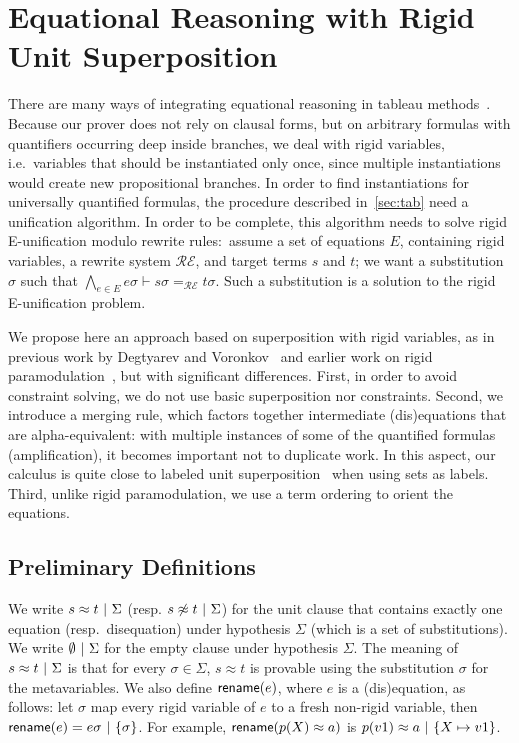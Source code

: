 
\section{Equational Reasoning with Rigid Unit Superposition}
\label{sec:super}

There are many ways of integrating equational reasoning in tableau
methods~\cite{DB75,LS02,BR15,DV96}. Because our prover does not rely on clausal
forms, but on arbitrary formulas with quantifiers occurring deep inside
branches, we deal with rigid variables, i.e.~variables that should be instantiated
only once, since multiple instantiations would create new propositional branches.
In order to find instantiations for universally quantified formulas, the procedure
described in~\ref{sec:tab} need a unification algorithm. In order to be complete,
this algorithm needs to solve rigid E-unification modulo rewrite rules:~assume a set of
equations $E$, containing rigid variables, a rewrite system $\mathcal{RE}$,
and target terms $s$ and $t$; we want a substitution $\sigma$ such that
$\bigwedge_{e \in E} e\sigma \vdash s\sigma =_\mathcal{RE} t\sigma$. Such a
substitution is a solution to the rigid E-unification problem.

We propose here an approach based on superposition with rigid variables, as in
previous work by Degtyarev and Voronkov~\cite{DV96} and earlier work on rigid
paramodulation~\cite{DAP00}, but with significant differences. First, in order
to avoid constraint solving, we do not use basic superposition nor
constraints. Second, we introduce a merging rule, which factors together
intermediate (dis)equations that are alpha-equivalent: with multiple instances
of some of the quantified formulas (amplification), it becomes important not to
duplicate work. In this aspect, our calculus is quite close to labeled unit
superposition~\cite{KS10} when using sets as labels. Third, unlike rigid
paramodulation, we use a term ordering to orient the equations.

\subsection{Preliminary Definitions}

We write $  s \approx t  ~|~  \Sigma$ (resp.
$ s \not\approx t  ~|~  \Sigma$) for the unit clause that contains
exactly one equation (resp.~disequation) under hypothesis $\Sigma$ (which is a
set of substitutions). We write $\emptyset ~|~ \Sigma$ for the
empty clause under hypothesis $\Sigma$.
The meaning of $s \approx t ~|~  \Sigma$ is
that for every $\sigma \in \Sigma$, $s \approx t$ is provable using the
substitution $\sigma$ for the metavariables.
We also define $\textsf{rename}(e)$, where $e$
is a (dis)equation, as follows: let $\sigma$ map every rigid variable of $e$ to
a fresh non-rigid variable, then
$\textsf{rename}(e) =  e\sigma  ~|~  \{ \sigma \} $. For example,
$\textsf{rename}(p(X)\approx a)$ is $ p(v1)\approx a ~|~  \{ X\mapsto
v1\} $.

